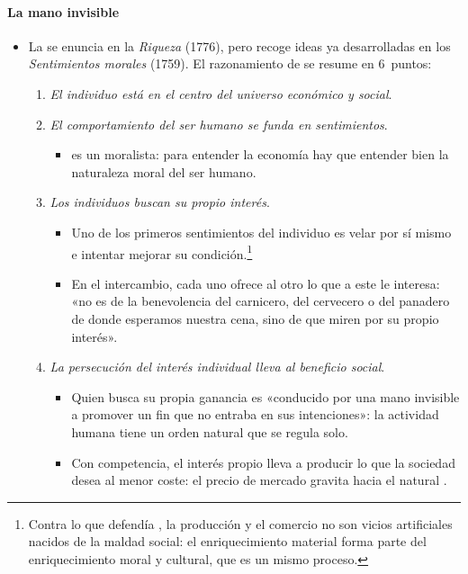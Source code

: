 \documentclass[11pt]{article}
\begin{document}
\paragraph{La mano invisible}\label{sec:smith-mano}
\begin{itemize}
\item La  se enuncia en la \emph{Riqueza} (1776), pero recoge ideas ya desarrolladas en los \emph{Sentimientos morales} (1759). El razonamiento de  se resume en 6~puntos:
  \begin{enumerate}
  \item \emph{El individuo está en el centro del universo económico y social}.
  \item \emph{El comportamiento del ser humano se funda en sentimientos}.
    \begin{itemize}
    \item {} es un moralista: para entender la economía hay que entender bien la naturaleza moral del ser humano.
    \end{itemize}
  \item \emph{Los individuos buscan su propio interés}.
    \begin{itemize}
    \item Uno de los primeros sentimientos del individuo es velar por sí mismo e intentar mejorar su condición.\footnote{Contra lo que defendía , la producción y el comercio no son vicios artificiales nacidos de la maldad social: el enriquecimiento material forma parte del enriquecimiento moral y cultural, que es un mismo proceso.}
    \item En el intercambio, cada uno ofrece al otro lo que a este le interesa: «no es de la benevolencia del carnicero, del cervecero o del panadero de donde esperamos nuestra cena, sino de que miren por su propio interés»\nocite{Smith1776Wealth}.
    \end{itemize}
  \item \emph{La persecución del interés individual lleva al beneficio social}.
    \begin{itemize}
    \item Quien busca su propia ganancia es «conducido por una mano invisible a promover un fin que no entraba en sus intenciones»\nocite{Smith1776Wealth}: la actividad humana tiene un orden natural que se regula solo.
    \item Con competencia, el interés propio lleva a producir lo que la sociedad desea al menor coste: el precio de mercado gravita hacia el natural .

\end{itemize}
\end{enumerate}
\end{itemize}
\end{document}

